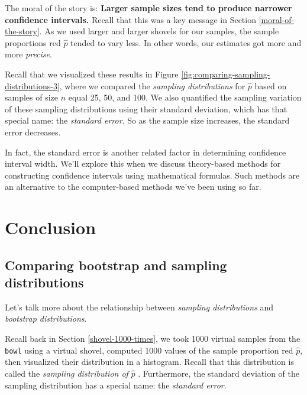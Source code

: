 \documentclass[
]{book}
\begin{document}
The moral of the story is:  \textbf{Larger sample sizes tend to produce narrower confidence intervals.} Recall that this was a key message in Section \ref{moral-of-the-story}. As we used larger and larger shovels for our samples, the sample proportions red \(\widehat{p}\) tended to vary less. In other words, our estimates got more and more \emph{precise}.

Recall that we visualized these results in Figure \ref{fig:comparing-sampling-distributions-3}, where we compared the \emph{sampling distributions} for \(\widehat{p}\) based on samples of size \(n\) equal 25, 50, and 100. We also quantified the sampling variation of these sampling distributions using their standard deviation, which has that special name: the \emph{standard error}. So as the sample size increases, the standard error decreases.

In fact, the standard error is another related factor in determining confidence interval width. We'll explore this when we discuss theory-based methods for constructing confidence intervals using mathematical formulas. Such methods are an alternative to the computer-based methods we've been using so far.

\hypertarget{ci-conclusion}{%
\section{Conclusion}\label{ci-conclusion}}

\hypertarget{bootstrap-vs-sampling}{%
\subsection{Comparing bootstrap and sampling distributions}\label{bootstrap-vs-sampling}}

Let's talk more about the relationship between \emph{sampling distributions} and \emph{bootstrap distributions}.

Recall back in Section \ref{shovel-1000-times}, we took 1000 virtual samples from the \texttt{bowl} using a virtual shovel, computed 1000 values of the sample proportion red \(\widehat{p}\), then visualized their distribution in a histogram. Recall that this distribution is called the \emph{sampling distribution of} \(\widehat{p}\) . Furthermore, the standard deviation of the sampling distribution has a special name: the \emph{standard error}.
\end{document}

